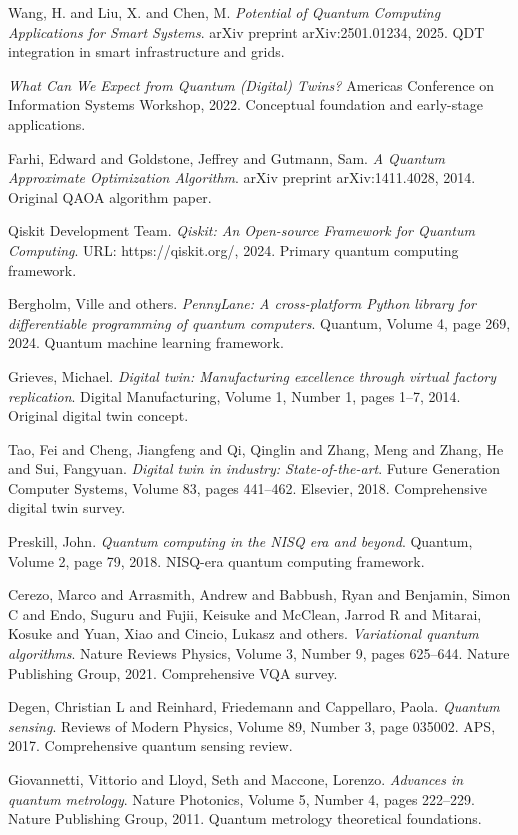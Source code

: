 \documentclass[12pt,a4paper]{article}
\begin{document}
\begin{thebibliography}{99}
Wang, H. and Liu, X. and Chen, M.
\textit{Potential of Quantum Computing Applications for Smart Systems}.
arXiv preprint arXiv:2501.01234, 2025.
QDT integration in smart infrastructure and grids.

\textit{What Can We Expect from Quantum (Digital) Twins?}
Americas Conference on Information Systems Workshop, 2022.
Conceptual foundation and early-stage applications.

Farhi, Edward and Goldstone, Jeffrey and Gutmann, Sam.
\textit{A Quantum Approximate Optimization Algorithm}.
arXiv preprint arXiv:1411.4028, 2014.
Original QAOA algorithm paper.

Qiskit Development Team.
\textit{Qiskit: An Open-source Framework for Quantum Computing}.
URL: https://qiskit.org/, 2024.
Primary quantum computing framework.

Bergholm, Ville and others.
\textit{PennyLane: A cross-platform Python library for differentiable programming of quantum computers}.
Quantum, Volume 4, page 269, 2024.
Quantum machine learning framework.

Grieves, Michael.
\textit{Digital twin: Manufacturing excellence through virtual factory replication}.
Digital Manufacturing, Volume 1, Number 1, pages 1--7, 2014.
Original digital twin concept.

Tao, Fei and Cheng, Jiangfeng and Qi, Qinglin and Zhang, Meng and Zhang, He and Sui, Fangyuan.
\textit{Digital twin in industry: State-of-the-art}.
Future Generation Computer Systems, Volume 83, pages 441--462. Elsevier, 2018.
Comprehensive digital twin survey.

Preskill, John.
\textit{Quantum computing in the NISQ era and beyond}.
Quantum, Volume 2, page 79, 2018.
NISQ-era quantum computing framework.

Cerezo, Marco and Arrasmith, Andrew and Babbush, Ryan and Benjamin, Simon C and Endo, Suguru and Fujii, Keisuke and McClean, Jarrod R and Mitarai, Kosuke and Yuan, Xiao and Cincio, Lukasz and others.
\textit{Variational quantum algorithms}.
Nature Reviews Physics, Volume 3, Number 9, pages 625--644. Nature Publishing Group, 2021.
Comprehensive VQA survey.

Degen, Christian L and Reinhard, Friedemann and Cappellaro, Paola.
\textit{Quantum sensing}.
Reviews of Modern Physics, Volume 89, Number 3, page 035002. APS, 2017.
Comprehensive quantum sensing review.

Giovannetti, Vittorio and Lloyd, Seth and Maccone, Lorenzo.
\textit{Advances in quantum metrology}.
Nature Photonics, Volume 5, Number 4, pages 222--229. Nature Publishing Group, 2011.
Quantum metrology theoretical foundations.

\end{thebibliography}
\end{document}
